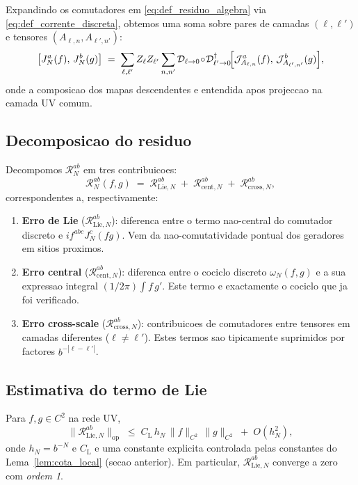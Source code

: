 Expandindo os comutadores em \eqref{eq:def_residuo_algebra} via
\eqref{eq:def_corrente_discreta}, obtemos uma soma sobre pares de
camadas $(\ell, \ell')$ e tensores $(A_{\ell,n}, A_{\ell',n'})$:
\begin{equation}
  \bigl[J_N^a(f),\,J_N^b(g)\bigr]
  \;=\; \sum_{\ell,\ell'} Z_\ell Z_{\ell'} \sum_{n,n'}
  \mathcal{D}_{\ell\to 0}\!\circ\!\mathcal{D}_{\ell'\to 0}^{\dagger}\!
  \Bigl[\mathcal{J}^a_{A_{\ell,n}}(f),\,\mathcal{J}^b_{A_{\ell',n'}}(g)\Bigr],
\end{equation}
onde a composicao dos mapas descendentes e entendida apos
projeccao na camada UV comum.

\subsection{Decomposicao do residuo}

Decompomos $\mathcal{R}_N^{ab}$ em tres contribuicoes:
\begin{equation}
  \mathcal{R}_N^{ab}(f,g) \;=\; \mathcal{R}^{ab}_{\mathrm{Lie},N}
  \;+\; \mathcal{R}^{ab}_{\mathrm{cent},N}
  \;+\; \mathcal{R}^{ab}_{\mathrm{cross},N},
  \label{eq:decomposicao_R}
\end{equation}
correspondentes a, respectivamente:
\begin{enumerate}
\item \textbf{Erro de Lie} ($\mathcal{R}^{ab}_{\mathrm{Lie},N}$):
diferenca entre o termo nao-central do comutador discreto e
$i f^{abc} J_N^c(fg)$. Vem da nao-comutatividade pontual dos
geradores em sitios proximos.

\item \textbf{Erro central} ($\mathcal{R}^{ab}_{\mathrm{cent},N}$):
diferenca entre o cociclo discreto $\omega_N(f,g)$ e a sua
expressao integral $(1/2\pi)\!\int\! f\,g'$. Este termo e
exactamente o cociclo que ja foi verificado.

\item \textbf{Erro cross-scale} ($\mathcal{R}^{ab}_{\mathrm{cross},N}$):
contribuicoes de comutadores entre tensores em camadas
diferentes ($\ell \neq \ell'$). Estes termos sao tipicamente
suprimidos por factores $b^{-|\ell-\ell'|}$.
\end{enumerate}

\subsection{Estimativa do termo de Lie}

\begin{proposition}\label{prop:Lie}
Para $f, g \in C^2$ na rede UV,
\begin{equation}
  \bigl\|\mathcal{R}^{ab}_{\mathrm{Lie},N}\bigr\|_{\mathrm{op}}
  \;\le\; C_{\mathrm{L}}\,h_N\,\|f\|_{C^2}\,\|g\|_{C^2}
  \;+\; O(h_N^2),
  \label{eq:cota_Lie}
\end{equation}
onde $h_N = b^{-N}$ e $C_{\mathrm{L}}$ e uma constante explicita
controlada pelas constantes do Lema~\ref{lem:cota_local}
(secao anterior). Em particular, $\mathcal{R}^{ab}_{\mathrm{Lie},N}$
converge a zero com \emph{ordem 1}.
\end{proposition}

